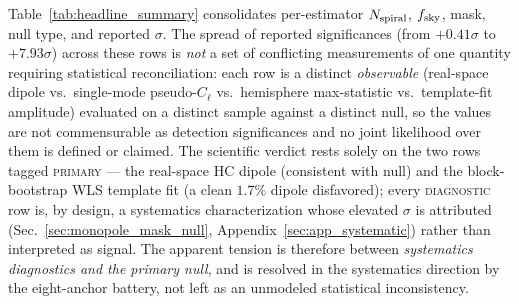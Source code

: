 \documentclass[aps,prd,twocolumn,superscriptaddress,preprintnumbers,nofootinbib,longbibliography,floatfix]{revtex4-2}
\newcommand{\sigmaunit}{\sigma}
\begin{document}
Table~\ref{tab:headline_summary} consolidates per-estimator $N_{\rm spiral}$, $f_{\rm sky}$, mask, null type, and reported $\sigma$. The spread of reported significances (from $+0.41\sigmaunit$ to $+7.93\sigmaunit$) across these rows is \emph{not} a set of conflicting measurements of one quantity requiring statistical reconciliation: each row is a distinct \emph{observable} (real-space dipole vs.\ single-mode pseudo-$C_\ell$ vs.\ hemisphere max-statistic vs.\ template-fit amplitude) evaluated on a distinct sample against a distinct null, so the values are not commensurable as detection significances and no joint likelihood over them is defined or claimed. The scientific verdict rests solely on the two rows tagged \textsc{primary} --- the real-space HC dipole (consistent with null) and the block-bootstrap WLS template fit (a clean $1.7\%$ dipole disfavored); every \textsc{diagnostic} row is, by design, a systematics characterization whose elevated $\sigma$ is attributed (Sec.~\ref{sec:monopole_mask_null}, Appendix~\ref{sec:app_systematic}) rather than interpreted as signal. The apparent tension is therefore between \emph{systematics diagnostics and the primary null}, and is resolved in the systematics direction by the eight-anchor battery, not left as an unmodeled statistical inconsistency.
\end{document}
